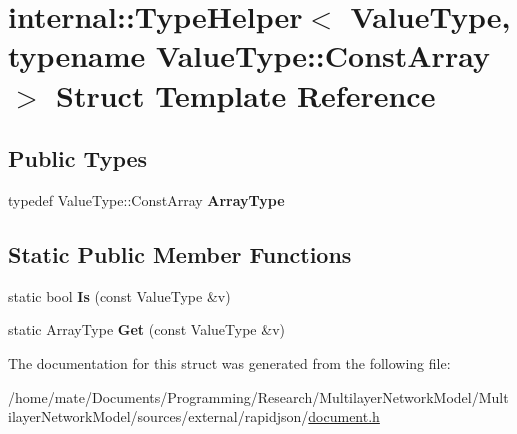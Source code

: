 \hypertarget{structinternal_1_1TypeHelper_3_01ValueType_00_01typename_01ValueType_1_1ConstArray_01_4}{}\section{internal\+:\+:Type\+Helper$<$ Value\+Type, typename Value\+Type\+:\+:Const\+Array $>$ Struct Template Reference}
\label{structinternal_1_1TypeHelper_3_01ValueType_00_01typename_01ValueType_1_1ConstArray_01_4}
\subsection*{Public Types}
\begin{DoxyCompactItemize}
\item 
typedef Value\+Type\+::\+Const\+Array {\bfseries Array\+Type}\hypertarget{structinternal_1_1TypeHelper_3_01ValueType_00_01typename_01ValueType_1_1ConstArray_01_4_a88c3a7bbff09fdd44ce6980f8122ba05}{}\label{structinternal_1_1TypeHelper_3_01ValueType_00_01typename_01ValueType_1_1ConstArray_01_4_a88c3a7bbff09fdd44ce6980f8122ba05}

\end{DoxyCompactItemize}
\subsection*{Static Public Member Functions}
\begin{DoxyCompactItemize}
\item 
static bool {\bfseries Is} (const Value\+Type \&v)\hypertarget{structinternal_1_1TypeHelper_3_01ValueType_00_01typename_01ValueType_1_1ConstArray_01_4_a259497292f89c58789b1e947249dd299}{}\label{structinternal_1_1TypeHelper_3_01ValueType_00_01typename_01ValueType_1_1ConstArray_01_4_a259497292f89c58789b1e947249dd299}

\item 
static Array\+Type {\bfseries Get} (const Value\+Type \&v)\hypertarget{structinternal_1_1TypeHelper_3_01ValueType_00_01typename_01ValueType_1_1ConstArray_01_4_a247811db25d6f25cc63175e03d847b8b}{}\label{structinternal_1_1TypeHelper_3_01ValueType_00_01typename_01ValueType_1_1ConstArray_01_4_a247811db25d6f25cc63175e03d847b8b}

\end{DoxyCompactItemize}


The documentation for this struct was generated from the following file\+:\begin{DoxyCompactItemize}
\item 
/home/mate/\+Documents/\+Programming/\+Research/\+Multilayer\+Network\+Model/\+Multilayer\+Network\+Model/sources/external/rapidjson/\hyperlink{document_8h}{document.\+h}\end{DoxyCompactItemize}

